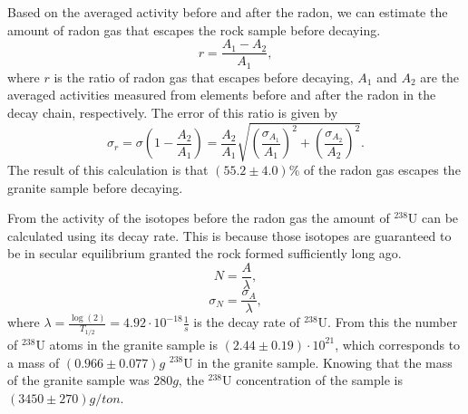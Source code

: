 \documentclass[pdftex,12pt,a4paper]{article}
\begin{document}
		Based on the averaged activity before and after the radon, we can estimate the amount of radon gas that escapes the rock sample before decaying.
		\begin{equation}
			r = \frac{A_1 - A_2}{A_1},
		\end{equation}
		where $r$ is the ratio of radon gas that escapes before decaying, $A_1$ and $A_2$ are the averaged activities measured from elements before and after the radon in the decay chain, respectively. The error of this ratio is given by
		\begin{equation}
			\sigma_r = \sigma\left(1 - \frac{A_2}{A_1}\right) = \frac{A_2}{A_1}\sqrt{\left(\frac{\sigma_{A_1}}{A_1}\right)^2 + \left(\frac{\sigma_{A_2}}{A_2}\right)^2}.
		\end{equation}
		The result of this calculation is that $(55.2\pm4.0)\%$ of the radon gas escapes the granite sample before decaying.
		
		From the activity of the isotopes before the radon gas the amount of $^{238}\text{U}$ can be calculated using its decay rate. This is because those isotopes are guaranteed to be in secular equilibrium granted the rock formed sufficiently long ago.
		\begin{equation}
			N = \frac{A}{\lambda},
		\end{equation}
		\begin{equation}
			\sigma_N = \frac{\sigma_A}{\lambda},
		\end{equation}
		where $\lambda = \frac{\log(2)}{T_{1/2}} = 4.92\cdot 10^{-18}\frac{1}{s}$ is the decay rate of $^{238}\text{U}$. From this the number of $^{238}\text{U}$ atoms in the granite sample is $(2.44\pm0.19)\cdot 10^{21}$, which corresponds to a mass of $(0.966\pm0.077)g$ $^{238}\text{U}$ in the granite sample. Knowing that the mass of the granite sample was $280g$, the $^{238}\text{U}$ concentration of the sample is $(3450\pm270)g/ton$.
\end{document}
